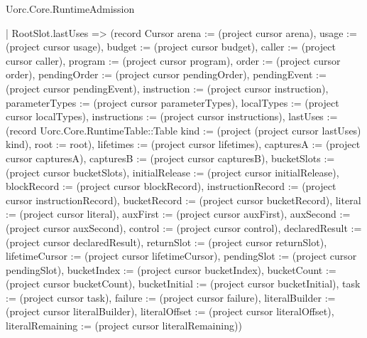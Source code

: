 \begin{lexlean}{Uorc.Core.RuntimeAdmission}
\begin{semanticmodule}
{    | RootSlot.lastUses => (record Cursor {arena := (project cursor arena), usage := (project cursor usage), budget := (project cursor budget), caller := (project cursor caller), program := (project cursor program), order := (project cursor order), pendingOrder := (project cursor pendingOrder), pendingEvent := (project cursor pendingEvent), instruction := (project cursor instruction), parameterTypes := (project cursor parameterTypes), localTypes := (project cursor localTypes), instructions := (project cursor instructions), lastUses := (record Uorc.Core.RuntimeTable::Table {kind := (project (project cursor lastUses) kind), root := root}), lifetimes := (project cursor lifetimes), capturesA := (project cursor capturesA), capturesB := (project cursor capturesB), bucketSlots := (project cursor bucketSlots), initialRelease := (project cursor initialRelease), blockRecord := (project cursor blockRecord), instructionRecord := (project cursor instructionRecord), bucketRecord := (project cursor bucketRecord), literal := (project cursor literal), auxFirst := (project cursor auxFirst), auxSecond := (project cursor auxSecond), control := (project cursor control), declaredResult := (project cursor declaredResult), returnSlot := (project cursor returnSlot), lifetimeCursor := (project cursor lifetimeCursor), pendingSlot := (project cursor pendingSlot), bucketIndex := (project cursor bucketIndex), bucketCount := (project cursor bucketCount), bucketInitial := (project cursor bucketInitial), task := (project cursor task), failure := (project cursor failure), literalBuilder := (project cursor literalBuilder), literalOffset := (project cursor literalOffset), literalRemaining := (project cursor literalRemaining)})
}
\end{semanticmodule}
\end{lexlean}
